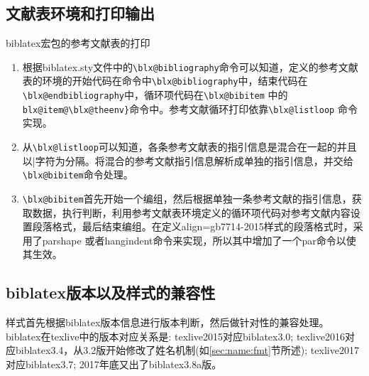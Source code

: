 \subsection{文献表环境和打印输出}
  biblatex宏包的参考文献表的打印
  \begin{enumerate}
  \item 根据biblatex.sty文件中的\verb|\blx@bibliography|命令可以知道，定义的参考文献表的环境的开始代码在命令中\verb|\blx@bibliography|中，结束代码在\verb|\blx@endbibliography|中，循环项代码在\verb|\blx@bibitem| 中的\verb|blx@item@\blx@theenv}|命令中。参考文献循环打印依靠\verb|\blx@listloop| 命令实现。
  \item 从\verb|\blx@listloop|可以知道，各条参考文献表的指引信息是混合在一起的并且以|字符为分隔。将混合的参考文献指引信息解析成单独的指引信息，并交给\verb|\blx@bibitem|命令处理。
  \item \verb|\blx@bibitem|首先开始一个编组，然后根据单独一条参考文献的指引信息，获取数据，执行判断，利用参考文献表环境定义的循环项代码对参考文献内容设置段落格式，最后结束编组。在定义align=gb7714-2015样式的段落格式时，采用了parshape 或者hangindent命令来实现，所以其中增加了一个par命令以使其生效。
  \end{enumerate}


\subsection{biblatex版本以及样式的兼容性}\label{sec:blx:compatibility}
样式首先根据biblatex版本信息进行版本判断，然后做针对性的兼容处理。
biblatex在texlive中的版本对应关系是:
texlive2015对应biblatex3.0;
texlive2016对应biblatex3.4，从3.2版开始修改了姓名机制(如\ref{sec:name:fmt}节所述);
texlive2017对应biblatex3.7;
2017年底又出了biblatex3.8a版。

